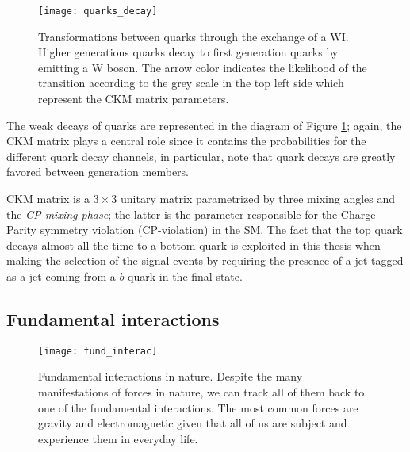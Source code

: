 \begin{figure}[!h]
  \centering
  \texttt{[image: quarks\_decay]}
  \caption[Transformations between quarks]{Transformations between quarks through the exchange of a WI. Higher generations quarks decay to first generation quarks by emitting a W boson. The arrow color indicates the likelihood of the transition according to the grey scale in the top left side which represent the CKM matrix parameters\cite{ckm}.}
  \label{quarks_decay}
\end{figure}

The weak decays of quarks are represented in the diagram of Figure \ref{quarks_decay}; again, the CKM matrix plays a central role since it contains the probabilities for the different quark decay channels, in particular, note that quark decays are greatly favored between generation members.

CKM matrix is a $3\times3$ unitary matrix parametrized by three mixing angles and the \textit{CP-mixing phase}; the latter is the parameter responsible for the Charge-Parity symmetry violation (CP-violation) in the SM. The fact that the top quark decays almost all the time to a bottom quark is exploited in this thesis when making the selection of the signal events by requiring the presence of a jet tagged as a jet coming from a $b$ quark in the final state.

\subsection{Fundamental interactions}\label{fund_inter}

\begin{figure}[h!]
  \centering
  \texttt{[image: fund\_interac]}
  \caption[Fundamental interactions in nature.]{Fundamental interactions in nature. Despite the many manifestations of forces in nature, we can track all of them back to one of the fundamental interactions. The most common forces are gravity and electromagnetic given that all of us are subject and experience them in everyday life.}
  \label{fund_interac}
\end{figure}

